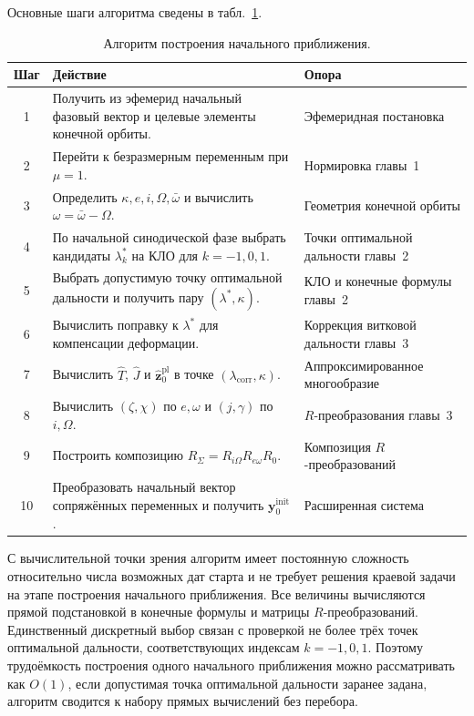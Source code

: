 Основные шаги алгоритма сведены в табл.~\ref{tab:chap4_initial_guess_algorithm}.

\begin{table}[htbp]
	\centering
	\caption{Алгоритм построения начального приближения.}
	\label{tab:chap4_initial_guess_algorithm}
	\begin{tabular}{cp{}p{}}
		\toprule
		Шаг & Действие & Опора \\
		\midrule
		1 &
		Получить из эфемерид начальный фазовый вектор и целевые элементы конечной орбиты. &
		Эфемеридная постановка \\
		2 &
		Перейти к безразмерным переменным при \(\mu=1\). &
		Нормировка главы~1 \\
		3 &
		Определить \(\kappa,e,i,\Omega,\bar{\omega}\) и вычислить \(\omega=\bar{\omega}-\Omega\). &
		Геометрия конечной орбиты \\
		4 &
		По начальной синодической фазе выбрать кандидаты \(\lambda_k^*\) на КЛО для \(k=-1,0,1\). &
		Точки оптимальной дальности главы~2 \\
		5 &
		Выбрать допустимую точку оптимальной дальности и получить пару \((\lambda^*,\kappa)\). &
		КЛО и конечные формулы главы~2 \\
		6 &
		Вычислить поправку к \(\lambda^*\) для компенсации деформации. &
		Коррекция витковой дальности главы~3 \\
		7 &
		Вычислить \(\widehat T\), \(\widehat J\) и \(\widehat{\mathbf z}^{\mathrm{pl}}_0\) в точке \((\lambda_{\mathrm{corr}},\kappa)\). &
		Аппроксимированное многообразие \\
		8 &
		Вычислить \((\zeta,\chi)\) по \(e,\omega\) и \((j,\gamma)\) по \(i,\Omega\). &
		\(R\)-преобразования главы~3 \\
		9 &
		Построить композицию \(R_{\Sigma}=R_{i\Omega}R_{e\omega}R_0\). &
		Композиция \(R\)-преобразований \\
		10 &
		Преобразовать начальный вектор сопряжённых переменных и получить \(\mathbf y_0^{\mathrm{init}}\). &
		Расширенная система \\
		\bottomrule
	\end{tabular}
\end{table}

С вычислительной точки зрения алгоритм имеет постоянную сложность относительно числа возможных дат старта и не требует решения краевой задачи на этапе построения начального приближения. Все величины вычисляются прямой подстановкой в конечные формулы и матрицы \(R\)-преобразований. Единственный дискретный выбор связан с проверкой не более трёх точек оптимальной дальности, соответствующих индексам \(k=-1,0,1\). Поэтому трудоёмкость построения одного начального приближения можно рассматривать как \(O(1)\), если допустимая точка оптимальной дальности заранее задана, алгоритм сводится к набору прямых вычислений без перебора.

